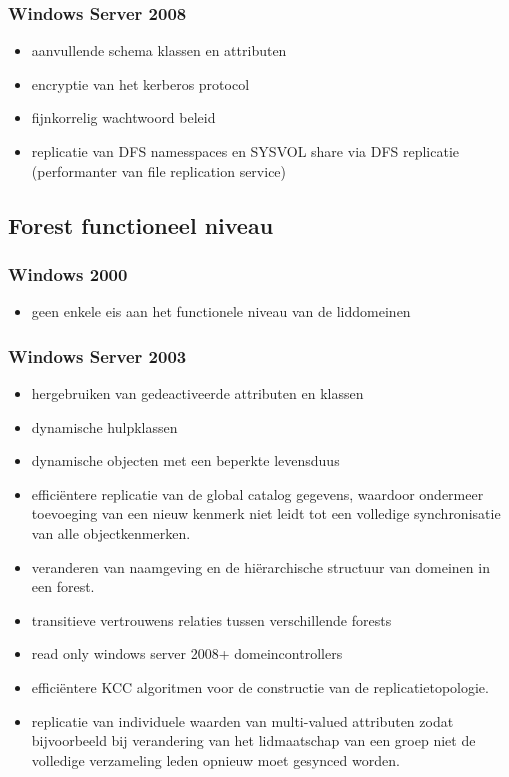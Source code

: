 \subsubsection{Windows Server 2008}
\begin{itemize}
\item aanvullende schema klassen en attributen 
\item encryptie van het kerberos protocol
\item fijnkorrelig wachtwoord beleid
\item replicatie van DFS namesspaces en SYSVOL share via DFS replicatie (performanter van file replication service)
\end{itemize}

\subsection{Forest functioneel niveau}
\subsubsection{Windows 2000}
\begin{itemize}
\item geen enkele eis aan het functionele niveau van de liddomeinen
\end{itemize}
\clearpage
\subsubsection{Windows Server 2003}
\begin{itemize}
\item hergebruiken van gedeactiveerde attributen en klassen
\item dynamische hulpklassen
\item dynamische objecten met een beperkte levensduus
\item effici\"entere replicatie van de global catalog gegevens, waardoor ondermeer toevoeging van een nieuw kenmerk niet leidt tot een volledige synchronisatie van alle objectkenmerken.
\item veranderen van naamgeving en de hi\"erarchische structuur van domeinen in een forest.
\item transitieve vertrouwens relaties tussen verschillende forests
\item read only windows server 2008+ domeincontrollers
\item effici\"entere KCC algoritmen voor de constructie van de replicatietopologie.
\item replicatie van individuele waarden van multi-valued attributen zodat bijvoorbeeld bij verandering van het lidmaatschap van een groep niet de volledige verzameling leden opnieuw moet gesynced worden.
\end{itemize}

